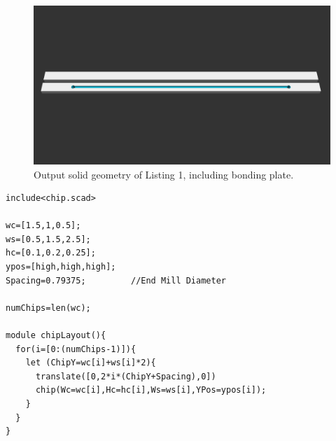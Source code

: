 \begin{figure}[htb]
  \begin{minipage}[t]{0.99\linewidth}\centering
    \includegraphics[width=14cm]{PaperExampleListing1}
  \end{minipage}\hfill
  \caption[Single solid geometry]{Output solid geometry of Listing 1, including bonding plate.}
  \label{fig:listing1}
\end{figure}


\begin{minipage}{0.99\linewidth}
\begin{lstlisting}[caption={The single line of code in Listing \ref{lst:chip} can then be iterated upon to form an array of different device geometries that can be sent directly to a CAM tool for toolpath generation}, label={lst:chipLayout}, frame=single, language=scad]
include<chip.scad>

wc=[1.5,1,0.5];
ws=[0.5,1.5,2.5];
hc=[0.1,0.2,0.25];
ypos=[high,high,high];
Spacing=0.79375;         //End Mill Diameter

numChips=len(wc);

module chipLayout(){
  for(i=[0:(numChips-1)]){
    let (ChipY=wc[i]+ws[i]*2){
      translate([0,2*i*(ChipY+Spacing),0])
      chip(Wc=wc[i],Hc=hc[i],Ws=ws[i],YPos=ypos[i]);
    }
  }
}
\end{lstlisting}
\end{minipage}

